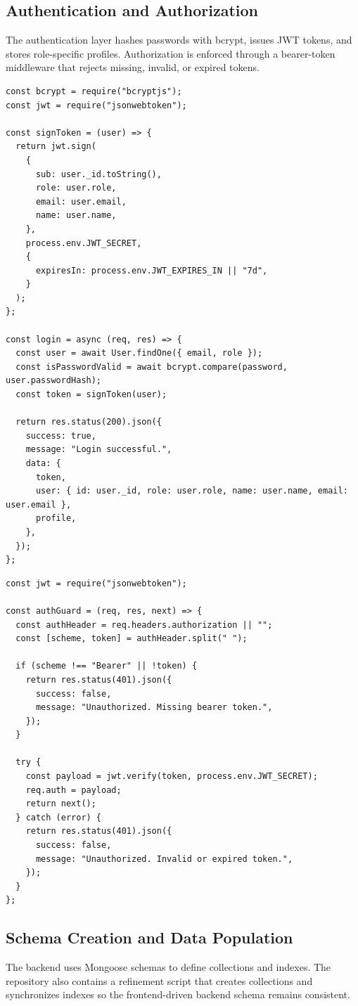 \documentclass[12pt,a4paper]{article}
\begin{document}
\subsection{Authentication and Authorization}
The authentication layer hashes passwords with bcrypt, issues JWT tokens, and stores role-specific profiles. Authorization is enforced through a bearer-token middleware that rejects missing, invalid, or expired tokens.

\begin{lstlisting}
const bcrypt = require("bcryptjs");
const jwt = require("jsonwebtoken");

const signToken = (user) => {
  return jwt.sign(
    {
      sub: user._id.toString(),
      role: user.role,
      email: user.email,
      name: user.name,
    },
    process.env.JWT_SECRET,
    {
      expiresIn: process.env.JWT_EXPIRES_IN || "7d",
    }
  );
};

const login = async (req, res) => {
  const user = await User.findOne({ email, role });
  const isPasswordValid = await bcrypt.compare(password, user.passwordHash);
  const token = signToken(user);

  return res.status(200).json({
    success: true,
    message: "Login successful.",
    data: {
      token,
      user: { id: user._id, role: user.role, name: user.name, email: user.email },
      profile,
    },
  });
};
\end{lstlisting}

\begin{lstlisting}
const jwt = require("jsonwebtoken");

const authGuard = (req, res, next) => {
  const authHeader = req.headers.authorization || "";
  const [scheme, token] = authHeader.split(" ");

  if (scheme !== "Bearer" || !token) {
    return res.status(401).json({
      success: false,
      message: "Unauthorized. Missing bearer token.",
    });
  }

  try {
    const payload = jwt.verify(token, process.env.JWT_SECRET);
    req.auth = payload;
    return next();
  } catch (error) {
    return res.status(401).json({
      success: false,
      message: "Unauthorized. Invalid or expired token.",
    });
  }
};
\end{lstlisting}

\subsection{Schema Creation and Data Population}
The backend uses Mongoose schemas to define collections and indexes. The repository also contains a refinement script that creates collections and synchronizes indexes so the frontend-driven backend schema remains consistent.
\end{document}
